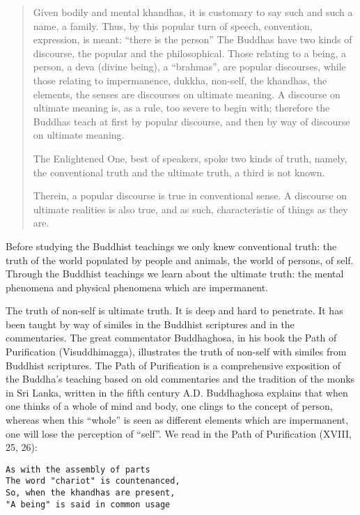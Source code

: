 \documentclass{book}
\begin{document}
\begin{quote}
Given bodily and mental khandhas, it is customary to say such and such a
name, a family. Thus, by this popular turn of speech, convention,
expression, is meant: ``there is the person'' The Buddhas have two kinds
of discourse, the popular and the philosophical. Those relating to a
being, a person, a deva (divine being), a ``brahmas'', are popular
discourses, while those relating to impermanence, dukkha, non-self, the
khandhas, the elements, the senses are discourses on ultimate meaning. A
discourse on ultimate meaning is, as a rule, too severe to begin with;
therefore the Buddhas teach at first by popular discourse, and then by
way of discourse on ultimate meaning.

The Enlightened One, best of speakers, spoke two kinds of truth, namely,
the conventional truth and the ultimate truth, a third is not known.

Therein, a popular discourse is true in conventional sense. A discourse
on ultimate realities is also true, and as such, characteristic of
things as they are.
\end{quote}

Before studying the Buddhist teachings we only knew con­ventional truth:
the truth of the world populated by people and animals, the world of
persons, of self. Through the Buddhist teachings we learn about the
ultimate truth: the mental phenomena and physical phenomena which are
impermanent.

The truth of non-self is ultimate truth. It is deep and hard to
penetrate. It has been taught by way of similes in the Buddhist
scriptures and in the commentaries. The great commentator Buddhaghosa,
in his book the Path of Purification (Visuddhimagga), illustrates the
truth of non-self with similes from Buddhist scriptures. The Path of
Purification is a comprehensive exposition of the Buddha's teaching
based on old commentaries and the tradition of the monks in Sri Lanka,
written in the fifth century A.D. Buddhaghosa explains that when one
thinks of a whole of mind and body, one clings to the concept of person,
whereas when this ``whole'' is seen as different elements which are
impermanent, one will lose the perception of ``self''.
We read in the Path of Purification (XVIII, 25, 26):

\begin{verbatim}
As with the assembly of parts
The word "chariot" is countenanced,
So, when the khandhas are present,
"A being" is said in common usage
\end{verbatim}
\end{document}
